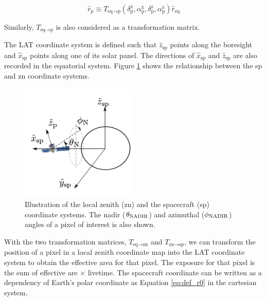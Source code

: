 \begin{equation}
    \hat{r}_\text{p} \equiv T_{\text{eq}\rightarrow\text{p}} (\delta^\text{x}_\text{p}, \alpha^\text{x}_\text{p}, \delta^\text{z}_\text{p}, \alpha^\text{z}_\text{p}) \hat{r}_\text{eq}
    \label{eq:rep_tf_eq_p}
\end{equation}

Similarly, $T_{\text{eq}\rightarrow\text{p}}$ is also considered as 
a transformation matrix.



The LAT coordinate system is defined such that $\hat{z}_\text{sp}$
points along the boresight and $\hat{x}_\text{sp}$ points
along one of its solar panel.
The directions of $\hat{x}_\text{sp}$ and $\hat{z}_\text{sp}$
are also recorded in the
equatorial system. Figure \ref{fig:coord_eq_p} shows the
relationship between the sp and zn coordinate systems.

\begin{figure}[h!]
    \centering
    \includegraphics[width=0.5\textwidth]{content/methodology/figures/coord_eq_p.pdf}
    \caption{
        Illustration of the local zenith (zn) and the spacecraft
        (sp) coordinate systems. The nadir ($\theta_{\rm NADIR}$)
        and azimuthal ($\phi_{\rm NADIR}$) angles of a pixel of
        interest is also shown.
    }
    \label{fig:coord_eq_p}
\end{figure}


With the two transformation matrices,
$T_{\text{eq}\rightarrow\text{zn}}$
and $T_{\text{zn}\rightarrow\text{sp}}$,
we can transform the position of a pixel in a local zenith
coordinate map into the LAT coordinate system to obtain
the effective area for that pixel. The exposure for that
pixel is the sum of effective are $\times$ livetime.
The spacecraft coordinate can be 
written as a dependency of Earth's polar coordinate as Equation \ref{eq:def_r0}
in the cartesian system.

